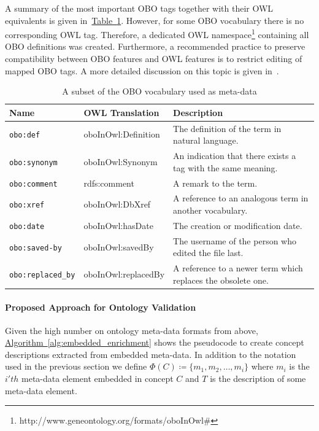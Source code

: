 \documentclass[draft,final]{vutinfth} %
\begin{document}
A summary of the most important OBO tags together with their OWL equivalents is given in~\hyperref[table:obo]{Table~\ref*{table:obo}}. However, for some OBO vocabulary there is no corresponding OWL tag. Therefore, a dedicated OWL namespace\footnote{http://www.geneontology.org/formats/oboInOwl\#} containing all OBO definitions was created. Furthermore, a recommended practice to preserve compatibility between OBO features and OWL features is to restrict editing of mapped OBO tags. A more detailed discussion on this topic is given in~\cite{tirmizi2011, tirmizi2006}.

\begingroup
\renewcommand{\arraystretch}{2}
\begin{table}
	\begin{tabularx}{\textwidth}{l|l|X}
		\textbf{Name} & \textbf{OWL Translation} & \textbf{Description} \\
		\hline
        \texttt{obo:def} & oboInOwl:Definition & The definition of the term in natural language.\\
		\texttt{obo:synonym} & oboInOwl:Synonym & An indication that there exists a tag with the same meaning.\\
		\texttt{obo:comment} & rdfs:comment & A remark to the term. \\
		\texttt{obo:xref} & oboInOwl:DbXref & A reference to an analogous term in another vocabulary.\\
		\texttt{obo:date} & oboInOwl:hasDate & The creation or modification date.\\
		\texttt{obo:saved-by} & oboInOwl:savedBy & The username of the person who edited the file last.\\
		\texttt{obo:replaced\_by} & oboInOwl:replacedBy & A reference to a newer term which replaces the obsolete one.\\
	\end{tabularx}
	\caption{A subset of the OBO vocabulary used as meta-data}
	\label{table:obo}
\end{table}
\endgroup

\paragraph{Proposed Approach for Ontology Validation} Given the high number on ontology meta-data formats from above, \hyperref[alg:embedded_enrichment]{Algorithm~\ref*{alg:embedded_enrichment}} shows the pseudocode to create concept descriptions extracted from embedded meta-data. In addition to the notation used in the previous section we define $\Phi(C) \coloneqq \{m_1, m_2, \ldots, m_i \}$ where $m_i$ is the $i'th$ meta-data element embedded in concept $C$ and $T$ is the description of some meta-data element.
\end{document}
